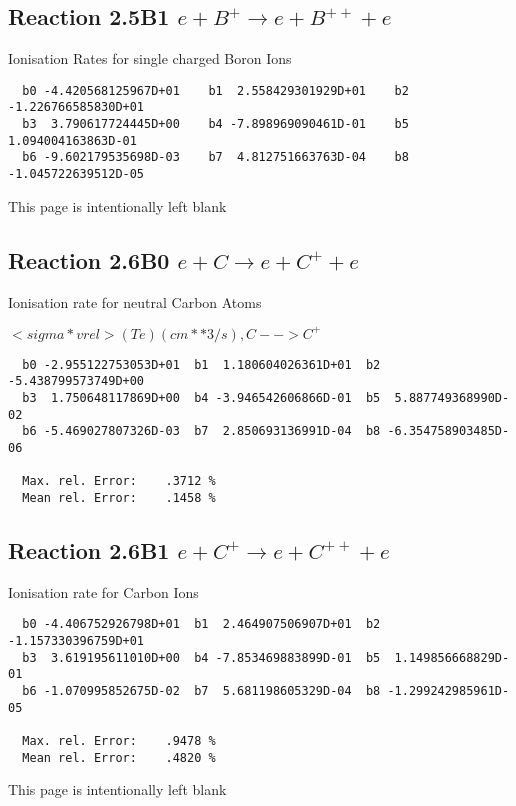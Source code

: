 \documentclass[12pt]{article}
\begin{document}
\subsection{
Reaction 2.5B1   $e + B^+ \rightarrow e + B^{++} + e $
}

 Ionisation Rates for single charged Boron Ions


\begin{small}\begin{verbatim}
  b0 -4.420568125967D+01    b1  2.558429301929D+01    b2 -1.226766585830D+01
  b3  3.790617724445D+00    b4 -7.898969090461D-01    b5  1.094004163863D-01
  b6 -9.602179535698D-03    b7  4.812751663763D-04    b8 -1.045722639512D-05
\end{verbatim}\end{small}

\newpage
This page is intentionally left blank
\newpage

\subsection{
Reaction 2.6B0   $e + C \rightarrow e + C^+ + e  $
}

  Ionisation rate for neutral Carbon Atoms

  $<sigma*vrel>(Te)  (cm**3/s), C --> C^+$

\begin{small}\begin{verbatim}
  b0 -2.955122753053D+01  b1  1.180604026361D+01  b2 -5.438799573749D+00
  b3  1.750648117869D+00  b4 -3.946542606866D-01  b5  5.887749368990D-02
  b6 -5.469027807326D-03  b7  2.850693136991D-04  b8 -6.354758903485D-06

  Max. rel. Error:    .3712 %
  Mean rel. Error:    .1458 %

\end{verbatim}\end{small}
\subsection{
Reaction 2.6B1   $e + C^+ \rightarrow e + C^{++} + e  $
}

  Ionisation rate for Carbon Ions


\begin{small}\begin{verbatim}
  b0 -4.406752926798D+01  b1  2.464907506907D+01  b2 -1.157330396759D+01
  b3  3.619195611010D+00  b4 -7.853469883899D-01  b5  1.149856668829D-01
  b6 -1.070995852675D-02  b7  5.681198605329D-04  b8 -1.299242985961D-05

  Max. rel. Error:    .9478 %
  Mean rel. Error:    .4820 %

\end{verbatim}\end{small}
\newpage
This page is intentionally left blank
\newpage
\end{document}

